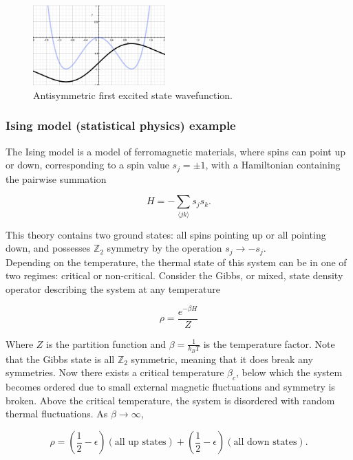 \begin{figure}[H]
	\centering
	\includegraphics[width=2in]{images/mexhat2d_first.png}
	\caption*{Antisymmetric first excited state wavefunction.}
\end{figure}

\subsubsection*{Ising model (statistical physics) example}

\noindent The Ising model is a model of ferromagnetic materials, where spins can point up or down, corresponding to a spin value $s_j =  \pm 1$, with a Hamiltonian containing the pairwise summation

\begin{equation}
H = -\sum_{\langle jk \rangle} s_j s_k.
\end{equation}

\noindent This theory contains two ground states: all spins pointing up or all pointing down, and possesses $\mathbb{Z}_2$ symmetry by the operation $s_j \rightarrow -s_j$. \\

\noindent Depending on the temperature, the thermal state of this system can be in one of two regimes: critical or non-critical. Consider the Gibbs, or mixed, state density operator describing the system at any temperature

\begin{equation}
\rho = \frac{e^{-\beta H}}{Z}
\end{equation}

\noindent Where $Z$ is the partition function and $\beta = \frac{1}{k_B T}$ is the temperature factor. Note that the Gibbs state is all $\mathbb{Z}_2$ symmetric, meaning that it does break any symmetries. Now there exists a critical temperature $\beta_{c}$, below which the system becomes ordered due to small external magnetic fluctuations and symmetry is broken. Above the critical temperature, the system is disordered with random thermal fluctuations. As $\beta \rightarrow \infty$,

\begin{equation}
\rho = \left(\frac{1}{2} - \epsilon\right) (\text{all up states}) + \left(\frac{1}{2} - \epsilon \right)(\text{all down states}).
\end{equation}

